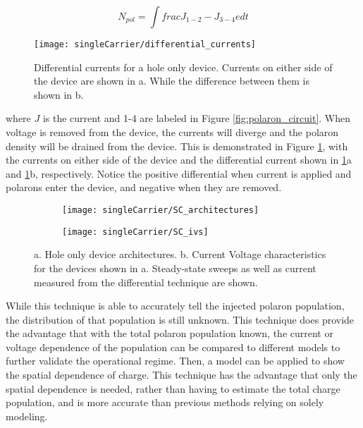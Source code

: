\documentclass[../thesis.tex]{subfiles}
\begin{document}
\begin{equation}
N_{pol}=\int frac{J_{1-2}-J_{3-4}}{e}dt
\label{eqn:polaron_population_calculation}
\end{equation}

\begin{figure}[ht]
\centering
\texttt{[image: singleCarrier/differential\_currents]}
\caption{Differential currents for a hole only device. Currents on either side of the device are shown in a. While the difference between them is shown in b.}
\label{fig:differential_currents}
\end{figure}

where $J$ is the current and 1-4 are labeled in Figure \ref{fig:polaron_circuit}.
When voltage is removed from the device, the currents will diverge and the polaron density will be drained from the device.
This is demonstrated in Figure \ref{fig:differential_currents}, with the currents on either side of the device and the differential current shown in \ref{fig:differential_currents}a and \ref{fig:differential_currents}b, respectively.
Notice the positive differential when current is applied and polarons enter the device, and negative when they are removed.

\begin{figure}[hb]
    \centering%
    \begin{subfigure}{.3\textwidth}
    \texttt{[image: singleCarrier/SC\_architectures]}
    \caption{}
    \label{fig:SC_architectures}\par\vfill
    \end{subfigure}
    \begin{subfigure}{.3\textwidth}
    \texttt{[image: singleCarrier/SC\_ivs]}
    \caption{}
    \label{fig:SC_ivs}
    \end{subfigure}
\caption{a. Hole only device architectures. b. Current Voltage characteristics for the devices shown in a.  Steady-state sweeps as well as current measured from the differential technique are shown.}
\end{figure}

While this technique is able to accurately tell the injected polaron population, the distribution of that population is still unknown.
This technique does provide the advantage that with the total polaron population known, the current or voltage dependence of the population can be compared to different models to further validate the operational regime.
Then, a model can be applied to show the spatial dependence of charge.\supercite{Pope1999,Mark1962,Lampert2002a}
This technique has the advantage that only the spatial dependence is needed, rather than having to estimate the total charge population, and is more accurate than previous methods relying on solely modeling.
\end{document}

